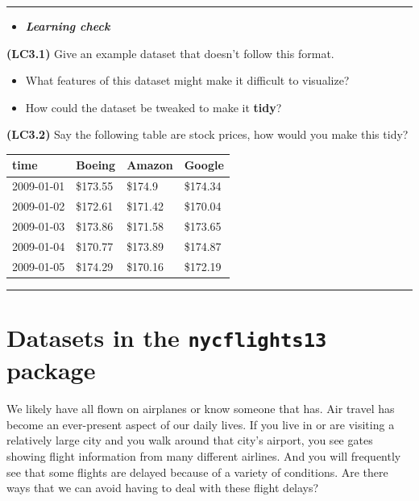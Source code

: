 \documentclass[]{tufte-book}
\let\oldrule=\rule
\renewcommand{\rule}[1]{\oldrule{\linewidth}}
\providecommand{\tightlist}{%
  \setlength{\itemsep}{0pt}\setlength{\parskip}{0pt}}
\newenvironment{rmdblock}[1]
  {\begin{shaded*}
  \begin{itemize}
  \renewcommand{\labelitemi}{
    \raisebox{-.7\height}[0pt][0pt]{
    }
  }
  \item
  }
  {
  \end{itemize}
  \end{shaded*}
  }
\newenvironment{learncheck}
  {\begin{rmdblock}{warning}}
  {\end{rmdblock}}
\theoremstyle{definition}
\theoremstyle{definition}
\theoremstyle{remark}
\begin{document}
\begin{center}\rule{0.5\linewidth}{\linethickness}\end{center}

\begin{learncheck}
\textbf{\emph{Learning check}}
\end{learncheck}

\textbf{(LC3.1)} Give an example dataset that doesn't follow this
format.

\begin{itemize}
\tightlist
\item
  What features of this dataset might make it difficult to visualize?\\
\item
  How could the dataset be tweaked to make it \textbf{tidy}?
\end{itemize}

\textbf{(LC3.2)} Say the following table are stock prices, how would you
make this tidy?

\begin{tabular}{l|l|l|l}
\hline
time & Boeing & Amazon & Google\\
\hline
2009-01-01 & \$173.55 & \$174.9 & \$174.34\\
\hline
2009-01-02 & \$172.61 & \$171.42 & \$170.04\\
\hline
2009-01-03 & \$173.86 & \$171.58 & \$173.65\\
\hline
2009-01-04 & \$170.77 & \$173.89 & \$174.87\\
\hline
2009-01-05 & \$174.29 & \$170.16 & \$172.19\\
\hline
\end{tabular}

\begin{center}\rule{0.5\linewidth}{\linethickness}\end{center}

\section{\texorpdfstring{Datasets in the \texttt{nycflights13}
package}{Datasets in the nycflights13 package}}\label{datasets-in-the-nycflights13-package}

We likely have all flown on airplanes or know someone that has. Air
travel has become an ever-present aspect of our daily lives. If you live
in or are visiting a relatively large city and you walk around that
city's airport, you see gates showing flight information from many
different airlines. And you will frequently see that some flights are
delayed because of a variety of conditions. Are there ways that we can
avoid having to deal with these flight delays?
\end{document}
